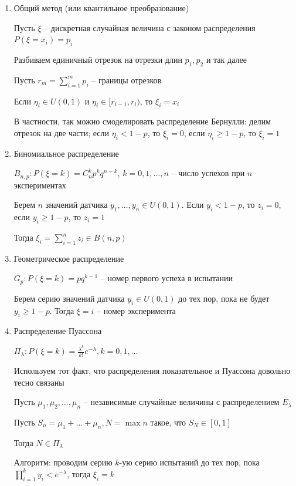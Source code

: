 \begin{enumerate}[label*=\Roman*. ]
    \item Общий метод (или квантильное преобразование)

    Пусть $\xi$ -- дискретная случайная величина с законом распределения $P(\xi = x_i) = p_i$

    Разбиваем единичный отрезок на отрезки длин $p_1, p_2$ и так далее

    Пусть $r_m = \sum_{i = 1}^m p_i$ -- границы отрезков

    Если $\eta_i \in U(0, 1)$ и $\eta_i \in [r_{i-1}, r_{i})$, то $\xi_i = x_i$

    В частности, так можно смоделировать распределение Бернулли: делим отрезок на две части; если $\eta_i < 1 - p$, то $\xi_i = 0$, если $\eta_i \geq 1 - p$, то $\xi_i = 1$

    \item Биномиальное распределение

    $B_{n,p}: P(\xi = k) = C_n^k p^k q^{n - k}$, $k = 0, 1, \dots, n$ -- число успехов при $n$ экспериментах
    
    Берем $n$ значений датчика $y_1, \dots, y_n \in U(0, 1)$. Если $y_i < 1 - p$, то $z_i = 0$, если $y_i \geq 1 - p$, то $z_i = 1$

    Тогда $\xi_i = \sum_{i = 1}^n z_i \in B(n, p)$

    \item Геометрическое распределение

    $G_p: P(\xi = k) = p q^{k - 1}$ -- номер первого успеха в испытании

    Берем серию значений датчика $y_i \in U(0, 1)$ до тех пор, пока не будет $y_i \geq 1 - p$. Тогда $\xi = i$ -- номер эксперимента

    \item Распределение Пуассона

    $\Pi_\lambda: P(\xi = k) = \frac{\lambda^k}{k!} e^{-\lambda}, k = 0, 1, \dots$

    Используем тот факт, что распределения показательное и Пуассона довольно тесно связаны

    \begin{MyTheorem}
        \Ths Пусть $\mu_1, \mu_2, \dots, \mu_n$ -- независимые случайные величины с распределением $E_\lambda$

        Пусть $S_n = \mu_1 + \dots + \mu_n, N = \max n$ такое, что $S_N \in [0, 1]$

        Тогда $N \in \Pi_\lambda$
    \end{MyTheorem}

    Алгоритм: проводим серию $k$-ую серию испытаний до тех пор, пока $\prod^k_{i = 1} y_i < e^{-\lambda}$, тогда $\xi_i = k$

\end{enumerate}


